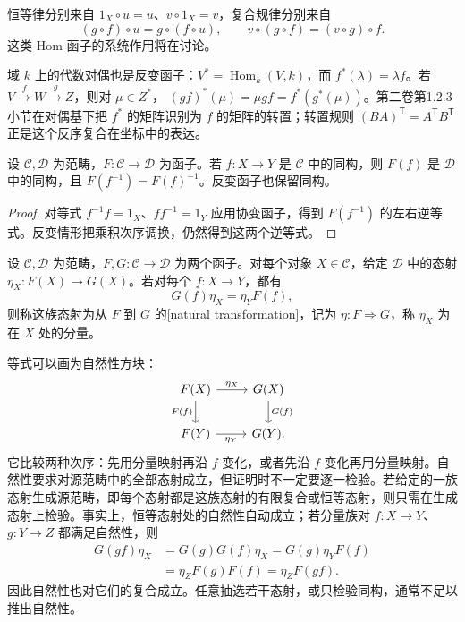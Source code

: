 恒等律分别来自 \(1_X\circ u=u\)、\(v\circ1_X=v\)，复合规律分别来自
\[
	(g\circ f)\circ u=g\circ(f\circ u),\qquad v\circ(g\circ f)=(v\circ g)\circ f.
\]
这类 Hom 函子的系统作用将在讨论。

\ProseParagraphBreak
域 \(k\) 上的代数对偶也是反变函子：\(V^*=\operatorname{Hom}_k(V,k)\)，而 \(f^*(\lambda)=\lambda f\)。若 \(V\xrightarrow{f}W\xrightarrow{g}Z\)，则对 \(\mu\in Z^*\)， \((gf)^*(\mu)=\mu gf=f^*(g^*(\mu))\)。第二卷第1.2.3小节在对偶基下把 \(f^*\) 的矩阵识别为 \(f\) 的矩阵的转置；转置规则 \((BA)^{\mathsf T}=A^{\mathsf T}B^{\mathsf T}\) 正是这个反序复合在坐标中的表达。

\begin{proposition}\label{b4:prop:functors-preserve-isomorphisms}
	设 \(\mathcal C,\mathcal D\) 为范畴，\(F:\mathcal C\rightarrow\mathcal D\) 为函子。若 \(f:X\rightarrow Y\) 是 \(\mathcal C\) 中的同构，则 \(F(f)\) 是 \(\mathcal D\) 中的同构，且 \(F(f^{-1})=F(f)^{-1}\)。反变函子也保留同构。
\end{proposition}
\begin{proof}
	对等式 \(f^{-1}f=1_X\)、\(ff^{-1}=1_Y\) 应用协变函子，得到 \(F(f^{-1})\) 的左右逆等式。反变情形把乘积次序调换，仍然得到这两个逆等式。
\end{proof}

\begin{definition}\label{b4:def:natural-transformation}
	设 \(\mathcal C,\mathcal D\) 为范畴，\(F,G:\mathcal C\rightarrow\mathcal D\) 为两个函子。对每个对象 \(X\in\mathcal C\)，给定 \(\mathcal D\) 中的态射 \(\eta_X:F(X)\rightarrow G(X)\)。若对每个 \(f:X\rightarrow Y\)，都有
	\[
		G(f)\eta_X=\eta_YF(f),
	\]
	则称这族态射为从 \(F\) 到 \(G\) 的[natural transformation]，记为 \(\eta:F\Rightarrow G\)，称 \(\eta_X\) 为在 \(X\) 处的分量。
\end{definition}

等式可以画为自然性方块：
\[
	\begin{tikzcd}
		F(X)\arrow[r,"\eta_X"]\arrow[d,"F(f)"']& G(X)\arrow[d,"G(f)"]\\
		F(Y)\arrow[r,"\eta_Y"']&G(Y).
	\end{tikzcd}
\]
它比较两种次序：先用分量映射再沿 \(f\) 变化，或者先沿 \(f\) 变化再用分量映射。自然性要求对源范畴中的全部态射成立，但证明时不一定要逐一检验。若给定的一族态射生成源范畴，即每个态射都是这族态射的有限复合或恒等态射，则只需在生成态射上检验。事实上，恒等态射处的自然性自动成立；若分量族对 \(f:X\rightarrow Y\)、\(g:Y\rightarrow Z\) 都满足自然性，则
\[
	\begin{aligned}
		G(gf)\eta_X &=G(g)G(f)\eta_X =G(g)\eta_YF(f)\\
		&=\eta_ZF(g)F(f) =\eta_ZF(gf).
	\end{aligned}
\]
因此自然性也对它们的复合成立。任意抽选若干态射，或只检验同构，通常不足以推出自然性。

